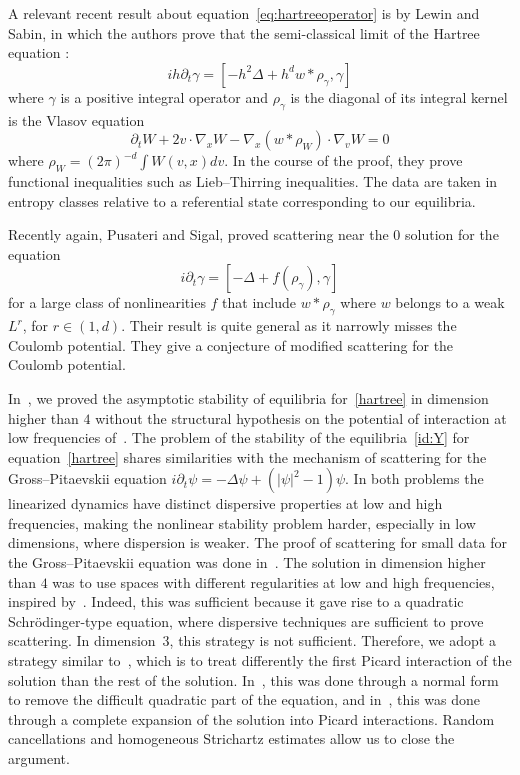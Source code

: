 \documentclass[10pt]{amsart}
\theoremstyle{definition}\newtheorem{defi}[theo]{Definition}\newtheorem{rema}[theo]{Remark}\newtheorem{exam}[theo]{Example}\newtheorem{exem}[theo]{Example}\newtheorem{nota}[theo]{Notation}
\newcommand{\pa}{\partial}
\begin{document}
\noindent A relevant recent result about equation~\eqref{eq:hartreeoperator} is by Lewin and Sabin, \cite{LS3} in which the authors prove that the semi-classical limit of the Hartree equation :
\begin{equation}\label{hartreesemicl}
ih \partial_t \gamma = \left[-h^2 \Delta + h^d w* \rho_\gamma, \gamma\right]
\end{equation}
where $\gamma$ is a positive integral operator and $\rho_\gamma$ is the diagonal of its integral kernel is the Vlasov equation
\begin{equation}\label{Vlasov}
\partial_t W + 2 v\cdot \nabla_x W - \nabla_x (w*\rho_W) \cdot \nabla_v W = 0
\end{equation}
where $\rho_W = (2\pi)^{-d} \int W(v,x) dv$. In the course of the proof, they prove functional inequalities such as Lieb--Thirring inequalities. The data are taken in entropy classes relative to a referential state corresponding to our equilibria.

Recently again, Pusateri and Sigal, \cite{PuSi19} proved scattering near the $0$ solution for the equation
\[
i\partial_t \gamma = \left[-\Delta + f(\rho_\gamma),\gamma\right]
\]
for a large class of nonlinearities $f$ that include $w*\rho_\gamma$ where $w$ belongs to a weak $L^r$, for $r\in (1,d)$. Their result is quite general as it narrowly misses the Coulomb potential. They give a conjecture of modified scattering for the Coulomb potential.

In~\cite{CodS}, we proved the asymptotic stability of equilibria for~\eqref{hartree} in dimension higher than $4$ without the structural hypothesis on the potential of interaction at low frequencies of~\cite{CHP2}. The problem of the stability of the equilibria~\eqref{id:Y} for equation~\eqref{hartree} shares similarities with the mechanism of scattering for the Gross--Pitaevskii equation $i\pa_t \psi=-\Delta \psi+(|\psi|^2-1)\psi$. In both problems the linearized dynamics have distinct dispersive properties at low and high frequencies, making the nonlinear stability problem harder, especially in low dimensions, where dispersion is weaker. The proof of scattering for small data for the Gross--Pitaevskii equation was done in~\cite{GHN,GNT3,GNT2,GNT}. The solution in dimension higher than $4$ was to use spaces with different regularities at low and high frequencies, inspired by~\cite{GNT}. Indeed, this was sufficient because it gave rise to a quadratic Schr\"odinger-type equation, where dispersive techniques are sufficient to prove scattering. In dimension~$3$, this strategy is not sufficient. Therefore, we adopt a strategy similar to~\cite{GHN,GNT3,GNT2,lewsab2}, which is to treat differently the first Picard interaction of the solution than the rest of the solution. In~\cite{GHN,GNT3,GNT2}, this was done through a normal form to remove the difficult quadratic part of the equation, and in~\cite{lewsab2}, this was done through a complete expansion of the solution into Picard interactions. Random cancellations and homogeneous Strichartz estimates allow us to close the argument.
\end{document}
